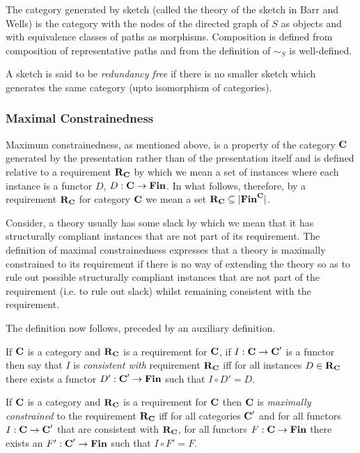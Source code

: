 \documentclass[10pt,a4paper]{article}
\theoremstyle{remark}
\renewcommand{\term}[1]{\textit{#1}}  %
\begin{document}
The category generated by sketch (called the theory of the sketch in Barr and Wells) is the category with
the nodes of the directed graph of $S$ as objects and with equivalence classes of paths as morphisms.
Composition is defined from composition of representative paths and from the definition of $\sim_S$ is well-defined.

A sketch is said to be \term{redundancy free} 
if there is no smaller sketch which generates the same category (upto isomorphism of categories).


\subsubsection{Maximal Constrainedness}
Maximum constrainedness, as mentioned above, is a property of the category $\textbf{C}$ generated by the presentation  rather than of the presentation itself and is defined  relative to a requirement $\textbf{R}_{\textbf{C}}$ by which we mean a set of 
instances where each instance is a functor $D$, $D: \textbf{C} \rightarrow \textbf{Fin}$. In what follows, therefore,  by a requirement $\textbf{R}_{\textbf{C}}$ for category $\textbf{C}$ we mean a set  $\textbf{R}_{\textbf{C}} \subseteq | \textbf{Fin}^{\textbf{C}} |$. 

Consider, a theory usually has some slack by which we mean that it has structurally compliant instances that are not part of its requirement.  The definition of maximal constrainedness expresses that a theory is maximally constrained to its requirement if there is no way of extending the theory so as to rule out possible structurally compliant instances that are not part of the requirement (i.e. to rule out slack) whilst remaining consistent with the requirement.

The definition now follows, preceded by an auxiliary definition.
\begin{definition}
If $\textbf{C}$ is a category and $\textbf{R}_{\textbf{C}}$ is a requirement for $\textbf{C}$,  if $I: \textbf{C} \rightarrow \textbf{C}'$ is a functor then say that $I$ is \term{consistent with} requirement $\textbf{R}_{\textbf{C}}$ iff for all instances $D \in \textbf{R}_{\textbf{C}}$ there exists a functor $D':\textbf{C}' \rightarrow \textbf{Fin}$ such that $I \circ D'=D$.
\end{definition}
\begin{definition}
If $\textbf{C}$ is a category and $\textbf{R}_{\textbf{C}}$ is a requirement for $\textbf{C}$ then $\textbf{C}$ is \term{maximally constrained} to the requirement $\textbf{R}_{\textbf{C}}$ iff for all categories $\textbf{C}'$ and for all functors $I:\textbf{C} \rightarrow \textbf{C}'$ that are consistent with $\textbf{R}_{\textbf{C}}$, for all functors $F: \textbf{C} \rightarrow \textbf{Fin}$  there exists an $F' : \textbf{C}' \rightarrow \textbf{Fin}$ such that $I \circ F'=F$.
\end{definition}
\end{document}
